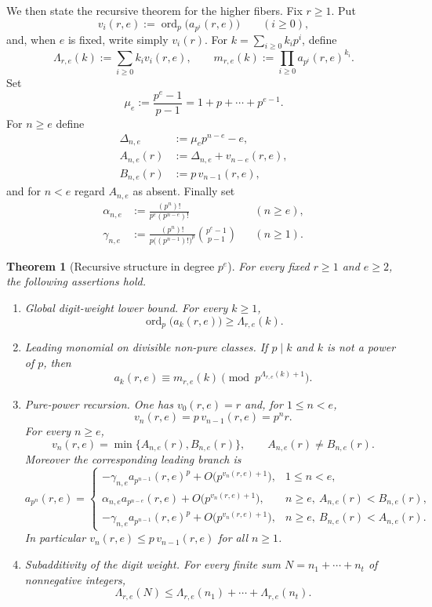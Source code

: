 \documentclass[11pt]{amsart}
\numberwithin{equation}{section}
\newtheorem{theorem}{Theorem}[section]
\DeclareMathOperator{\ordop}{ord}
\newcommand{\bigo}{O}
\newcommand{\vp}{\ordop_p}
\begin{document}
We then state the recursive theorem for the higher fibers.  Fix $r\ge 1$.  Put
\[
        v_i(r,e):=\vp\bigl(a_{p^i}(r,e)\bigr)\qquad (i\ge 0),
\]
and, when $e$ is fixed, write simply $v_i(r)$.  For $k=\sum_{i\ge 0}k_ip^i$, define
\[
        \Lambda_{r,e}(k):=\sum_{i\ge 0}k_iv_i(r,e),
        \qquad
        m_{r,e}(k):=\prod_{i\ge 0}a_{p^i}(r,e)^{k_i}.
\]
Set
\[
        \mu_e:=\frac{p^e-1}{p-1}=1+p+\cdots+p^{e-1}.
\]
For $n\ge e$ define
\[
\begin{aligned}
        \Delta_{n,e}&:=\mu_e p^{n-e}-e,\\
        A_{n,e}(r)&:=\Delta_{n,e}+v_{n-e}(r,e),\\
        B_{n,e}(r)&:=p\,v_{n-1}(r,e),
\end{aligned}
\]
and for $n<e$ regard $A_{n,e}$ as absent.  Finally set
\[
\begin{aligned}
        \alpha_{n,e}&:=\frac{(p^n)!}{p^e(p^{n-e})!} && (n\ge e),\\
        \gamma_{n,e}&:=\frac{(p^n)!}{p\bigl((p^{n-1})!\bigr)^p}\binom{p^e-1}{p-1} && (n\ge 1).
\end{aligned}
\]

\begin{theorem}[Recursive structure in degree $p^e$]\label{thm:higher-structure}
For every fixed $r\ge 1$ and $e\ge 2$, the following assertions hold.
\begin{enumerate}[label=\textup{(\arabic*)},leftmargin=2.2em]
\item \emph{Global digit-weight lower bound.}  For every $k\ge 1$,
\[
        \vp\bigl(a_k(r,e)\bigr)\ge \Lambda_{r,e}(k).
\]
\item \emph{Leading monomial on divisible non-pure classes.}  If $p\mid k$ and $k$ is not a power of $p$, then
\[
        a_k(r,e)\equiv m_{r,e}(k)\pmod {p^{\Lambda_{r,e}(k)+1}}.
\]
\item \emph{Pure-power recursion.}  One has $v_0(r,e)=r$ and, for $1\le n<e$,
\[
        v_n(r,e)=p\,v_{n-1}(r,e)=p^nr.
\]
For every $n\ge e$,
\[
        v_n(r,e)=\min\{A_{n,e}(r),B_{n,e}(r)\},
        \qquad
        A_{n,e}(r)\ne B_{n,e}(r).
\]
Moreover the corresponding leading branch is
\[
        a_{p^n}(r,e)=
        \begin{cases}
        -\gamma_{n,e}a_{p^{n-1}}(r,e)^p+\bigo\bigl(p^{v_n(r,e)+1}\bigr),&1\le n<e,\\[1mm]
        \alpha_{n,e}a_{p^{n-e}}(r,e)+\bigo\bigl(p^{v_n(r,e)+1}\bigr),& n\ge e,\ A_{n,e}(r)<B_{n,e}(r),\\[1mm]
        -\gamma_{n,e}a_{p^{n-1}}(r,e)^p+\bigo\bigl(p^{v_n(r,e)+1}\bigr),& n\ge e,\ B_{n,e}(r)<A_{n,e}(r).
        \end{cases}
\]
In particular $v_n(r,e)\le p\,v_{n-1}(r,e)$ for all $n\ge 1$.
\item \emph{Subadditivity of the digit weight.}  For every finite sum $N=n_1+\cdots+n_t$ of nonnegative integers,
\[
        \Lambda_{r,e}(N)\le \Lambda_{r,e}(n_1)+\cdots+\Lambda_{r,e}(n_t).
\]
\end{enumerate}
\end{theorem}
\end{document}

